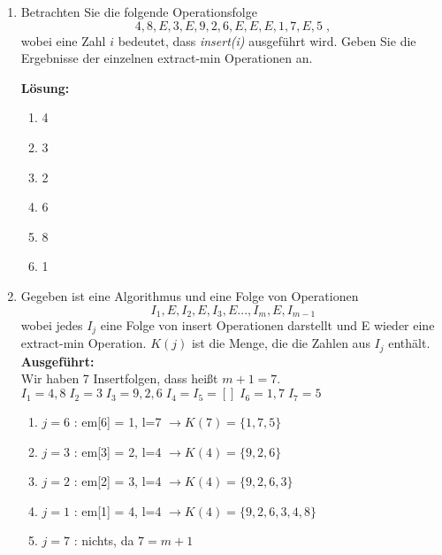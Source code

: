 \documentclass[11pt,a4paper,ngerman]{article}
\begin{document}
\begin{enumerate}[\bfseries a)]

\item Betrachten  Sie die folgende Operationsfolge
$$
4,8,E,3,E,9,2,6,E,E,E,1,7,E,5 \; ,
$$
wobei eine Zahl $i$ bedeutet, dass \emph{insert(i)} ausgeführt wird. Geben Sie die Ergebnisse der einzelnen extract-min Operationen an.

\textbf{Lösung:}\\
\begin{enumerate}

\item 4

\item 3

\item 2

\item 6

\item 8

\item 1

\end{enumerate}

\item Gegeben ist eine Algorithmus und eine Folge von Operationen
$$
I_1,E,I_2,E,I_3,E ...,I_m,E,I_{m-1}
$$
wobei jedes $I_{j}$ eine Folge von insert Operationen darstellt und E wieder eine extract-min Operation. $K(j)$ ist die Menge, die die Zahlen aus $I_j$ enthält.\\

\textbf{Ausgeführt:}\\
Wir haben 7 Insertfolgen, dass heißt $m+1=7$.\\
$I_1 = 4,8 \; I_2 = 3 \; I_3 = 9,2,6 \; I_4 = I_5 = [] \; I_6 = 1,7 \; I_7 = 5$
\begin{enumerate}[{i=}1 $\rightarrow$]

\item $j=6$ : em[6] = 1, l=7 $\rightarrow K(7) = \{1,7,5\} $

\item $j=3$ : em[3] = 2, l=4 $\rightarrow K(4) = \{ 9,2,6 \}$

\item $j=2$ : em[2] = 3, l=4 $\rightarrow K(4) = \{ 9, 2, 6, 3 \}$

\item $j=1$ : em[1] = 4, l=4 $\rightarrow K(4) = \{ 9, 2, 6, 3, 4, 8\}$

\item $j=7$ : nichts, da $7 = m+1$


\end{enumerate}
\end{enumerate}
\end{document}
